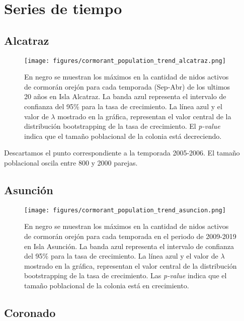 \documentclass{article} %
\begin{document}
\section*{Series de tiempo}

\subsection*{Alcatraz}

\begin{figure}[H]
\hspace{-2cm}
    \texttt{[image: figures/cormorant\_population\_trend\_alcatraz.png]}
\caption{En negro se muestran los máximos en la cantidad de nidos activos de cormorán orejón para cada temporada (Sep-Abr) de los ultimos 20 años en Isla Alcatraz. La banda azul representa el intervalo de confianza del 95\% para la tasa de crecimiento. La línea azul y el valor de $\lambda$ mostrado en la gráfica, representan el valor central de la distribución bootstrapping de la tasa de crecimiento. El \textit{p-value} indica que el tamaño poblacional de la colonia está decreciendo.}
\end{figure}

Descartamos el punto correspondiente a la temporada 2005-2006. El tamaño poblacional oscila entre 800 y 2000 parejas. 

\subsection*{Asunción}

\begin{figure}[H]
\hspace{-2cm}
    \texttt{[image: figures/cormorant\_population\_trend\_asuncion.png]}
\caption{En negro se muestran los máximos en la cantidad de nidos activos de cormorán orejón para cada temporada en el periodo de 2009-2019 en Isla Asunción. La banda azul representa el intervalo de confianza del 95\% para la tasa de crecimiento. La línea azul y el valor de $\lambda$ mostrado en la gráfica, representan el valor central de la distribución bootstrapping de la tasa de crecimiento. Las \textit{p-value} indica que el tamaño poblacional de la colonia está en crecimiento.}
\end{figure}

\subsection*{Coronado}
\end{document}
